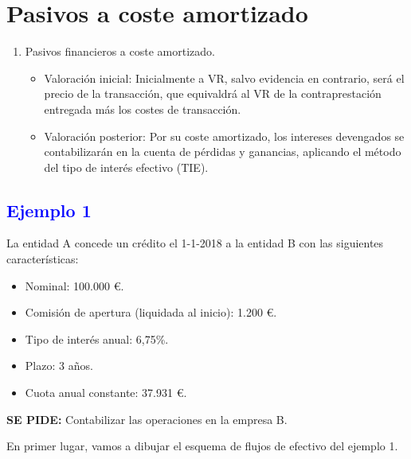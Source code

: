 \section{Pasivos a coste amortizado}

\begin{enumerate}
    \item Pasivos financieros a coste amortizado.
    \begin{itemize}
        \item Valoración inicial: Inicialmente a VR, salvo evidencia en contrario, será el precio de la transacción, que equivaldrá al VR de la contraprestación entregada más los costes de transacción.
        \item Valoración posterior: Por su coste amortizado, los intereses devengados se contabilizarán en la cuenta de pérdidas y ganancias, aplicando el método del tipo de interés efectivo (TIE).
    \end{itemize}
\end{enumerate}
\newpage
\subsection*{\textcolor{blue}{Ejemplo 1}}

La entidad A concede un crédito el 1-1-2018 a la entidad B con las siguientes características:
\begin{itemize}
    \item Nominal: 100.000 €.
    \item Comisión de apertura (liquidada al inicio): 1.200 €.
    \item Tipo de interés anual: 6,75\%.
    \item Plazo: 3 años.
    \item Cuota anual constante: 37.931 €.
\end{itemize}

\textbf{SE PIDE:} Contabilizar las operaciones en la empresa B.


En primer lugar, vamos a dibujar el esquema de flujos de efectivo del ejemplo 1.



